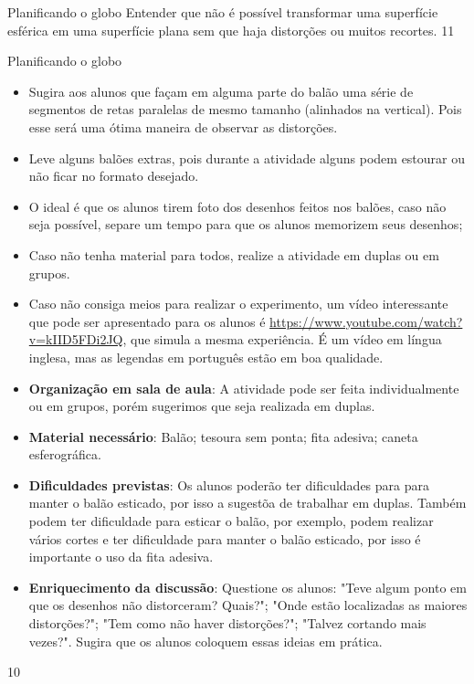 \begin{objectives}{Planificando o globo}
{
  Entender que não é possível transformar uma superfície esférica em uma superfície plana sem que haja distorções ou muitos recortes.
}{1}{1}
\end{objectives}
\clearmargin
\begin{sugestions}{Planificando o globo}
{
  \begin{itemize}
 
  \item Sugira aos alunos que façam em alguma parte do balão uma série de segmentos de retas paralelas de mesmo tamanho (alinhados na vertical). Pois esse será uma ótima maneira de observar as distorções.
  \item Leve alguns balões extras, pois durante a atividade alguns podem estourar ou não ficar no formato desejado.
  \item O ideal é que  os alunos tirem foto dos desenhos feitos nos balões, caso não seja possível, separe um tempo para que os alunos memorizem seus desenhos;
  \item Caso não tenha material para todos, realize a atividade em duplas ou em grupos.
  \item Caso não consiga meios para realizar o experimento, um vídeo interessante que pode ser apresentado para os alunos é \url{https://www.youtube.com/watch?v=kIID5FDi2JQ}, que simula a mesma experiência. É um vídeo em língua inglesa, mas as legendas em português estão em boa qualidade.
  \item \textbf{Organização em sala de aula}: A atividade pode ser feita individualmente ou em grupos, porém sugerimos que seja realizada em duplas.
  \item \textbf{Material necessário}: Balão; tesoura sem ponta; fita adesiva; caneta esferográfica.
  
   \item\textbf{Dificuldades previstas}: Os alunos poderão ter dificuldades para para manter o balão esticado, por isso a sugestõa de trabalhar em duplas. Também podem ter dificuldade para esticar o balão, por exemplo, podem realizar vários cortes e ter dificuldade para manter o balão esticado, por isso é importante o uso da fita adesiva.  
  \item\textbf{Enriquecimento da discussão}: Questione os alunos: "Teve algum ponto em que os desenhos não  distorceram? Quais?"; "Onde estão localizadas as maiores distorções?"; "Tem como não haver distorções?"; "Talvez cortando mais vezes?". Sugira que os alunos coloquem essas ideias em prática.
  \end{itemize}
}{1}{0}
\end{sugestions}
